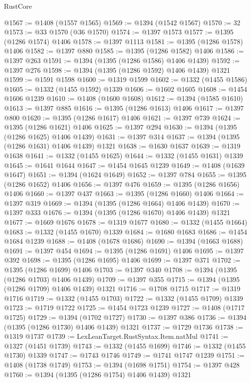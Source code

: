 \begin{lexlean}{RustCore}
\begin{coremodule}
@1567 := @1408 (@1557 @1565)
@1569 := @1394 (@1542 @1567)
@1570 := 32
@1573 := @33 @1570 (@36 @1570)
@1574 := @1397 @1573
@1577 := @1395 (@1286 @1574) @1406
@1578 := @1397 @1113
@1581 := @1395 (@1286 @1578) @1406
@1582 := @1397 @880
@1585 := @1395 (@1286 @1582) @1406
@1586 := @1397 @263
@1591 := @1394 (@1395 (@1286 @1586) @1406 @1439)
@1592 := @1397 @276
@1598 := @1394 (@1395 (@1286 @1592) @1406 @1439) @1321
@1599 := @1591 @1598
@1600 := @1319 @1599
@1602 := @1332 (@1455 @1586)
@1605 := @1332 (@1455 @1592) @1339
@1606 := @1602 @1605
@1608 := @1454 @1606 @1239
@1610 := @1408 (@1600 @1608)
@1612 := @1394 (@1585 @1610)
@1613 := @1397 @885
@1616 := @1395 (@1286 @1613) @1406
@1617 := @1397 @800
@1620 := @1395 (@1286 @1617) @1406
@1621 := @1397 @739
@1624 := @1395 (@1286 @1621) @1406
@1625 := @1397 @294
@1630 := @1394 (@1395 (@1286 @1625) @1406 @1439)
@1631 := @1397 @314
@1637 := @1394 (@1395 (@1286 @1631) @1406 @1439) @1321
@1638 := @1630 @1637
@1639 := @1319 @1638
@1641 := @1332 (@1455 @1625)
@1644 := @1332 (@1455 @1631) @1339
@1645 := @1641 @1644
@1647 := @1454 @1645 @1239
@1649 := @1408 (@1639 @1647)
@1651 := @1394 (@1624 @1649)
@1652 := @1397 @784
@1655 := @1395 (@1286 @1652) @1406
@1656 := @1397 @476
@1659 := @1395 (@1286 @1656) @1406
@1660 := @1397 @437
@1663 := @1395 (@1286 @1660) @1406
@1664 := @1397 @319
@1669 := @1394 (@1395 (@1286 @1664) @1406 @1439)
@1670 := @1397 @333
@1676 := @1394 (@1395 (@1286 @1670) @1406 @1439) @1321
@1677 := @1669 @1676
@1678 := @1319 @1677
@1680 := @1332 (@1455 @1664)
@1683 := @1332 (@1455 @1670) @1339
@1684 := @1680 @1683
@1686 := @1454 @1684 @1239
@1688 := @1408 (@1678 @1686)
@1690 := @1394 (@1663 @1688)
@1691 := @1397 @454
@1694 := @1395 (@1286 @1691) @1406
@1695 := @1397 @392
@1698 := @1395 (@1286 @1695) @1406
@1699 := @1397 @371
@1702 := @1395 (@1286 @1699) @1406
@1703 := @1397 @340
@1708 := @1394 (@1395 (@1286 @1703) @1406 @1439)
@1709 := @1397 @355
@1715 := @1394 (@1395 (@1286 @1709) @1406 @1439) @1321
@1716 := @1708 @1715
@1717 := @1319 @1716
@1719 := @1332 (@1455 @1703)
@1722 := @1332 (@1455 @1709) @1339
@1723 := @1719 @1722
@1725 := @1454 @1723 @1239
@1727 := @1408 (@1717 @1725)
@1729 := @1394 (@1702 @1727)
@1730 := @1397 @386
@1736 := @1394 (@1395 (@1286 @1730) @1406 @1439) @1321
@1737 := @1729 @1736
@1738 := @1319 @1737
@1739 := LexLeanTarget.RustSyntax.Item.natMul
@1741 := @1327 (@1451 @1739)
@1743 := @1332 (@1455 @1699)
@1746 := @1332 (@1455 @1730) @1339
@1747 := @1743 @1746
@1749 := @1741 @1747 @1239
@1751 := @1408 (@1738 @1749)
@1753 := @1394 (@1698 @1751)
@1754 := @1397 @428
@1760 := @1394 (@1395 (@1286 @1754) @1406 @1439) @1321

\end{coremodule}
\end{lexlean}
